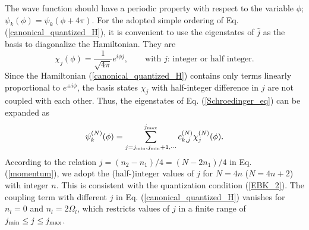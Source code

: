\documentclass[%
superscriptaddress,
preprint,
showpacs,
nofootinbib,
amsmath,amssymb,
aps,
prc,
floatfix ]%
{revtex4-1}
\begin{document}
The wave function should have a periodic property with respect to
the variable $\phi$;
$\psi_k(\phi)=\psi_k(\phi+4\pi)$.
For the adopted simple ordering of Eq. (\ref{canonical_quantized_H}),
it is convenient to use the eigenstates of $\hat{j}$ as the basis
to diagonalize the Hamiltonian.
They are
\begin{equation}
	\chi_j(\phi) = \frac{1}{\sqrt{4\pi}} e^{i\phi j} ,
	\quad\quad\mbox{with $j$: integer or half integer} .
\end{equation}
Since the Hamiltonian (\ref{canonical_quantized_H}) contains only
terms linearly proportional to $e^{\pm i\phi}$,
the basis states $\chi_j$ with half-integer difference in $j$
are not coupled with each other.
Thus, the eigenstates of Eq. (\ref{Schroedinger_eq}) can be expanded as
\begin{equation}
	\psi_k^{(N)}(\phi) = 
	\sum_{j=j_{\rm min},j_{\rm min}+1,\cdots}^{j_{\rm max}}
	c_{k,j}^{(N)} \chi_j^{(N)}(\phi) .
	\label{CQ_eigenstate}
\end{equation}
According to the relation $j=(n_2-n_1)/4=(N-2n_1)/4$ in Eq. (\ref{momentum}),
we adopt the (half-)integer values of $j$ for $N=4n$ ($N=4n+2$)
with integer $n$.
This is consistent with the quantization condition (\ref{EBK_2}).
The coupling term with different $j$
in Eq. (\ref{canonical_quantized_H}) vanishes
for $n_l=0$ and $n_l=2\Omega_l$,
which restricts values of $j$ in a finite range of
$j_{\rm min}\leq j \leq j_{\rm max}$.
\end{document}
